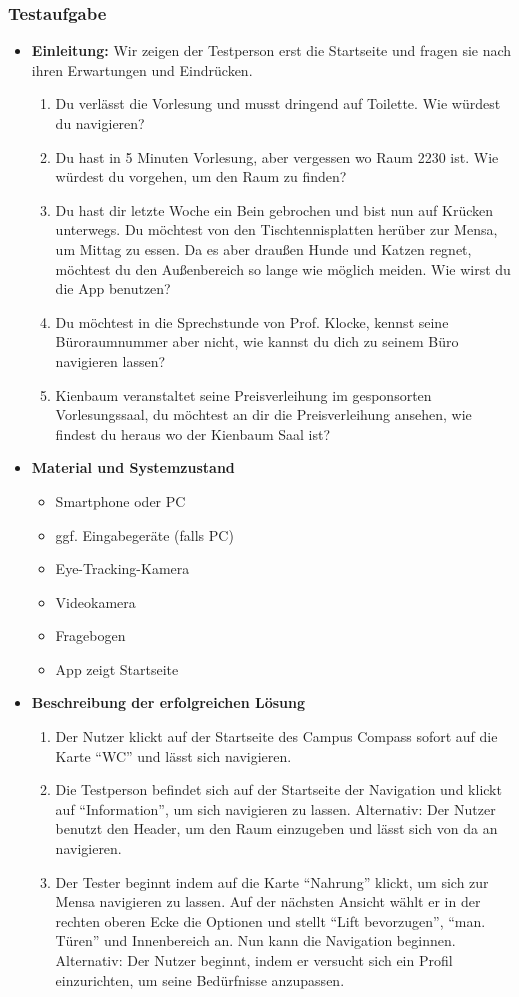 \subsubsection*{Testaufgabe}
\begin{itemize}
\item \textbf{Einleitung:} Wir zeigen der Testperson erst die Startseite und fragen sie nach ihren Erwartungen und Eindrücken.
\begin{enumerate}
\item Du verlässt die Vorlesung und musst dringend auf Toilette. Wie würdest du navigieren?
\item Du hast in 5 Minuten Vorlesung, aber vergessen wo Raum 2230 ist. Wie würdest du vorgehen, um den Raum zu finden?
\item Du hast dir letzte Woche ein Bein gebrochen und bist nun auf Krücken unterwegs. Du möchtest von den Tischtennisplatten herüber zur Mensa, um Mittag zu essen. Da es aber draußen Hunde und Katzen regnet, möchtest du den Außenbereich so lange wie möglich meiden. Wie wirst du die App benutzen?
\item Du möchtest in die Sprechstunde von Prof. Klocke, kennst seine Büroraumnummer aber nicht, wie kannst du dich zu seinem Büro navigieren lassen?
\item Kienbaum veranstaltet seine Preisverleihung im gesponsorten Vorlesungssaal, du möchtest an dir die Preisverleihung ansehen, wie findest du heraus wo der Kienbaum Saal ist?
\end{enumerate}
\item \textbf{Material und Systemzustand}
\begin{itemize}
\item Smartphone oder PC
\item ggf. Eingabegeräte (falls PC)
\item Eye-Tracking-Kamera
\item Videokamera
\item Fragebogen
\item App zeigt Startseite
\end{itemize}
\item \textbf{Beschreibung der erfolgreichen Lösung}
\begin{enumerate}
\item Der Nutzer klickt auf der Startseite des Campus Compass sofort auf die
  Karte ``WC'' und lässt sich navigieren.
\item Die Testperson befindet sich auf der Startseite der Navigation und klickt
  auf ``Information'', um sich navigieren zu lassen. Alternativ: Der Nutzer
  benutzt den Header, um den Raum einzugeben und lässt sich von da an
  navigieren.
\item Der Tester beginnt indem auf die Karte ``Nahrung'' klickt, um sich zur
  Mensa navigieren zu lassen. Auf der nächsten Ansicht wählt er in der rechten
  oberen Ecke die Optionen und stellt ``Lift bevorzugen'', ``man. Türen'' und
  Innenbereich an. Nun kann die Navigation beginnen. Alternativ: Der Nutzer
  beginnt, indem er versucht sich ein Profil einzurichten, um seine Bedürfnisse
  anzupassen.
\end{enumerate}
\end{itemize}
